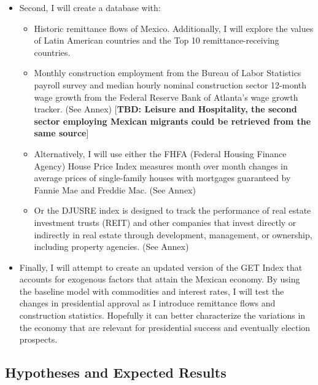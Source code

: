 \documentclass[
]{article}
\providecommand{\tightlist}{%
  \setlength{\itemsep}{0pt}\setlength{\parskip}{0pt}}
\begin{document}
\begin{itemize}
\tightlist
\item
  Second, I will create a database with:

  \begin{itemize}
  \tightlist
  \item
    Historic remittance flows of Mexico. Additionally, I will explore
    the values of Latin American countries and the Top 10
    remittance-receiving countries.
  \item
    Monthly construction employment from the Bureau of Labor Statistics
    payroll survey and median hourly nominal construction sector
    12-month wage growth from the Federal Reserve Bank of Atlanta's wage
    growth tracker. (See Annex) {[}\textbf{TBD: Leisure and Hospitality,
    the second sector employing Mexican migrants could be retrieved from
    the same source}{]}
  \item
    Alternatively, I will use either the FHFA (Federal Housing Finance
    Agency) House Price Index measures month over month changes in
    average prices of single-family houses with mortgages guaranteed by
    Fannie Mae and Freddie Mac. (See Annex)
  \item
    Or the DJUSRE index is designed to track the performance of real
    estate investment trusts (REIT) and other companies that invest
    directly or indirectly in real estate through development,
    management, or ownership, including property agencies. (See Annex)
  \end{itemize}
\item
  Finally, I will attempt to create an updated version of the GET Index
  that accounts for exogenous factors that attain the Mexican economy.
  By using the baseline model with commodities and interest rates, I
  will test the changes in presidential approval as I introduce
  remittance flows and construction statistics. Hopefully it can better
  characterize the variations in the economy that are relevant for
  presidential success and eventually election prospects.
\end{itemize}

\hypertarget{hypotheses-and-expected-results}{%
\subsection{Hypotheses and Expected
Results}\label{hypotheses-and-expected-results}}
\end{document}
